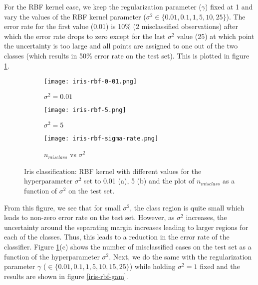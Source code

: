 \documentclass[paper=a4, fontsize=11pt]{scrartcl} %
\numberwithin{equation}{section} %
\begin{document}
For the RBF kernel case, we keep the regularization parameter ($\gamma$) fixed at 1 and vary the values of the RBF kernel parameter ($\sigma^2 \in \{0.01, 0.1, 1, 5, 10, 25\}$). The error rate for the first value (0.01) is 10\% (2 misclassified observations) after which the error rate drops to zero except for the last $\sigma^2$ value (25) at which point the uncertainty is too large and all points are assigned to one out of the two classes (which results in 50\% error rate on the test set). This is plotted in figure \ref{iris-rbf}.\\

\begin{figure}[ht]
\centering
	\begin{subfigure}[b]{0.3\textwidth}
		\centering
		\texttt{[image: iris-rbf-0-01.png]}
		\caption{$\sigma^2 = 0.01$}
	\end{subfigure}
	\begin{subfigure}[b]{0.3\textwidth}
		\centering
		\texttt{[image: iris-rbf-5.png]}
		\caption{$\sigma^2 = 5$}
	\end{subfigure}
	\begin{subfigure}[b]{0.3\textwidth}
		\centering
		\texttt{[image: iris-rbf-sigma-rate.png]}
		\caption{$n_{misclass}$ vs $\sigma^2$}
	\end{subfigure}
\caption{Iris classification: RBF kernel with different values for the hyperparameter $\sigma^2$ set to 0.01 (a), 5 (b) and the plot of $n_{misclass}$ as a function of $\sigma^2$ on the test set.}
\label{iris-rbf}
\end{figure}

From this figure, we see that for small $\sigma^2$, the class region is quite small which leads to non-zero error rate on the test set. However, as $\sigma^2$ increases, the uncertainty around the separating margin increases leading to larger regions for each of the classes. Thus, this leads to a reduction in the error rate of the classifier. Figure \ref{iris-rbf}(c) shows the number of misclassified cases on the test set as a function of the hyperparameter $\sigma^2$. Next, we do the same with the regularization parameter $\gamma$ ($\in \{0.01, 0.1, 1, 5, 10, 15, 25\}$) while holding $\sigma^2 = 1$ fixed and the results are shown in figure \ref{iris-rbf-gam}.\\
\end{document}

